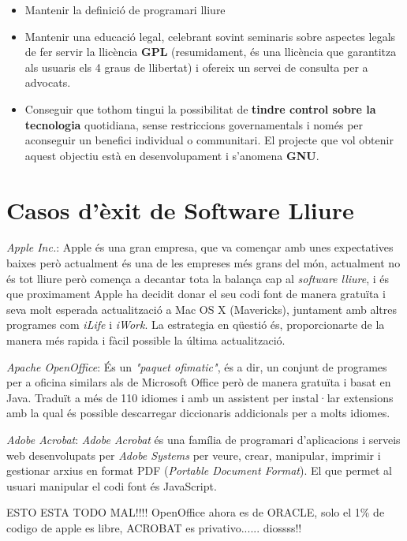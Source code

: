 	\begin{itemize}
	\item Mantenir la definició de programari lliure
	\item Mantenir una educació legal, celebrant sovint seminaris sobre aspectes legals de fer servir la 		llicència \textbf{GPL} (resumidament, és una llicència que garantitza als usuaris els 4 graus de 		llibertat) i ofereix un servei de consulta per a advocats.
	\item Conseguir que tothom tingui la possibilitat de \textbf{tindre control sobre la tecnologia} 		quotidiana, sense restriccions governamentals i només per aconseguir un benefici individual o 		communitari. El projecte que vol obtenir aquest objectiu està en desenvolupament i s'anomena 		\textbf{GNU}.
	\end{itemize}

\section{Casos d'èxit de Software Lliure}
	\emph{Apple Inc.}: Apple és una gran empresa, que va començar amb unes expectatives baixes però 		actualment és una de les empreses més grans del món, actualment no és tot lliure però comença a 	decantar tota la balança cap al \emph{software lliure}, i és que proximament Apple ha decidit 		donar el seu codi font de manera gratuïta i seva molt esperada actualització a Mac OS X (Mavericks), 		juntament amb altres programes com \emph{iLife} i \emph{iWork}. La estrategia en qüestió és, 		proporcionarte de la manera més rapida i fàcil possible la última actualització.

	\emph{Apache OpenOffice}: És un \emph{"paquet ofimatic"}, és a dir, un conjunt de programes per 		a oficina similars als de Microsoft Office però de manera gratuïta i basat en Java. Traduït a més de 		110 idiomes i amb un assistent per instal·lar extensions amb la qual és possible descarregar 		diccionaris addicionals per a molts idiomes.

	\emph{Adobe Acrobat}: \emph{Adobe Acrobat} és una família de programari d'aplicacions i serveis 		web desenvolupats per \emph{Adobe Systems} per veure, crear, manipular, imprimir i gestionar arxius en 		format PDF (\emph{Portable Document Format}). El que permet al usuari manipular el codi font és 	JavaScript.

	ESTO ESTA TODO MAL!!!! OpenOffice ahora es de ORACLE, solo el 1\% de codigo de apple es libre, ACROBAT es privativo...... diossss!!

